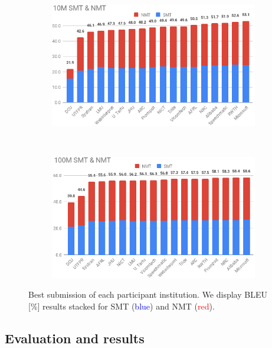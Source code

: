 \begin{figure}[ht]
  \centering
  \begin{subfigure}[b]{\columnwidth}
    \hspace*{-1.5em}
    \includegraphics[width=1.1\textwidth]{images/10M_crop.png}
    \label{fig:10M}
  \end{subfigure}
  ~
  \begin{subfigure}[b]{\columnwidth}
    \hspace*{-1.5em}
    \includegraphics[width=1.1\textwidth]{images/100M_crop.png}
    \label{fig:100M}
  \end{subfigure}
  \caption{Best submission of each participant institution. We display BLEU [\%] results stacked for SMT (\textcolor{blue}{blue}) and NMT (\textcolor{red}{red}).}
  \label{fig:results}
\end{figure}

\subsection{Evaluation and results}

